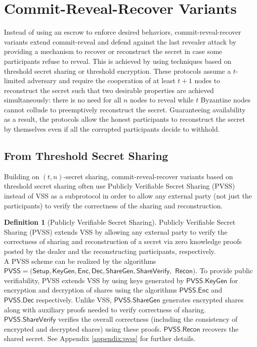 \documentclass[letterpaper,twocolumn,10pt]{article}
\theoremstyle{definition}
\newtheorem{definition}[theorem]{Definition}
\theoremstyle{remark}
\begin{document}
\section{Commit-Reveal-Recover Variants}
\label{section:commit-reveal-recover}
Instead of using an escrow to enforce desired behaviors, commit-reveal-recover variants extend commit-reveal and defend against the last revealer attack by providing a mechanism to recover or reconstruct the secret in case some participants refuse to reveal. This is achieved by using techniques based on threshold secret sharing or threshold encryption. These protocols assume a $t$-limited adversary and require the cooperation of at least $t + 1$ nodes to reconstruct the secret such that two desirable properties are achieved simultaneously: there is no need for all $n$ nodes to reveal while $t$ Byzantine nodes cannot collude to preemptively reconstruct the secret. Guaranteeing availability as a result, the protocols allow the honest participants to reconstruct the secret by themselves even if all the corrupted participants decide to withhold.

\subsection{From Threshold Secret Sharing}
Building on $(t, n)$-secret sharing, commit-reveal-recover variants based on threshold secret sharing often use Publicly Verifiable Secret Sharing (PVSS) \cite{schoenmakers1999simple, cascudo2017scrape} instead of VSS as a subprotocol in order to allow any external party (not just the participants) to verify the correctness of the sharing and reconstruction.

\begin{definition}[Publicly Verifiable Secret Sharing]
Publicly Verifiable Secret Sharing (PVSS) extends VSS by allowing any external party to verify the correctness of sharing and reconstruction of a secret via zero knowledge proofs posted by the dealer and the reconstructing participants, respectively.\\
A PVSS scheme can be realized by the algorithms $\mathsf{PVSS = (Setup, KeyGen, Enc, Dec, ShareGen, ShareVerify,}$  $\mathsf{Recon)}$.
To provide public verifiability, PVSS extends VSS by using keys generated by $\mathsf{PVSS.KeyGen}$ for encryption and decryption of shares using the algorithms $\mathsf{PVSS.Enc}$ and $\mathsf{PVSS.Dec}$ respectively. Unlike VSS, $\mathsf{PVSS.ShareGen}$ generates encrypted shares along with auxiliary proofs needed to verify correctness of sharing. $\mathsf{PVSS.ShareVerify}$ verifies the overall correctness (including the consistency of encrypted and decrypted shares) using these proofs. $\mathsf{PVSS.Recon}$ recovers the shared secret. See Appendix \ref{appendix:pvss} for further details.
\end{definition}
\end{document}
